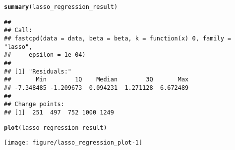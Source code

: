 \documentclass[article]{jss}\usepackage[]{graphicx}\usepackage[]{xcolor}
\makeatletter
\def\maxwidth{ %
  \ifdim\Gin@nat@width>\linewidth
    \linewidth
  \else
    \Gin@nat@width
  \fi
}
\newcommand{\hlstd}[1]{\textcolor[rgb]{0.345,0.345,0.345}{#1}}%
\newcommand{\hlkwd}[1]{\textcolor[rgb]{0.737,0.353,0.396}{\textbf{#1}}}%
\newenvironment{kframe}{%
 \def\at@end@of@kframe{}%
 \ifinner\ifhmode%
  \def\at@end@of@kframe{\end{minipage}}%
  \begin{minipage}{\columnwidth}%
 \fi\fi%
 \def\FrameCommand##1{\hskip\@totalleftmargin \hskip-\fboxsep
 \colorbox{shadecolor}{##1}\hskip-\fboxsep
     \hskip-\linewidth \hskip-\@totalleftmargin \hskip\columnwidth}%
 \MakeFramed {\advance\hsize-\width
   \@totalleftmargin\z@ \linewidth\hsize
   \@setminipage}}%
 {\par\unskip\endMakeFramed%
 \at@end@of@kframe}
\newenvironment{knitrout}{}{} %
\makeatother
\begin{document}
\begin{knitrout}
\color{fgcolor}\begin{kframe}
\begin{alltt}
\hlkwd{summary}\hlstd{(lasso_regression_result)}
\end{alltt}
\begin{verbatim}
## 
## Call:
## fastcpd(data = data, beta = beta, k = function(x) 0, family = "lasso", 
##     epsilon = 1e-04)
## 
## [1] "Residuals:"
##       Min        1Q    Median        3Q       Max 
## -7.348485 -1.209673  0.094231  1.271128  6.672489 
## 
## Change points:
## [1]  251  497  752 1000 1249
\end{verbatim}
\begin{alltt}
\hlkwd{plot}\hlstd{(lasso_regression_result)}
\end{alltt}
\end{kframe}
\texttt{[image: figure/lasso\_regression\_plot-1]} 
\end{knitrout}
\end{document}
